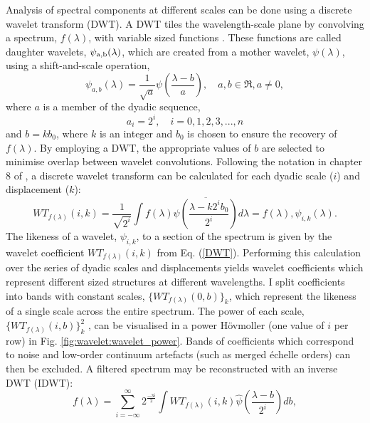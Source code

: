 Analysis of spectral components at different scales can be done using a discrete wavelet transform (DWT). A DWT tiles the wavelength-scale plane by convolving a spectrum, $f( \lambda )$, with variable sized functions \citep{2012AAS...22033004S}. These functions are called daughter wavelets, $\psi_{\rm a,b}(\lambda)$, which are created from a mother wavelet, $\psi(\lambda )$,  using a shift-and-scale operation,
%
\begin{equation}\label{daugthermother}
\psi_{a,b}(\lambda) = \frac{1}{\sqrt{a}}\psi(\frac{\lambda - b}{a}),\quad a,b \in  \Re, a \neq 0 ,
\end{equation}
%
where  $a$ is a member of the dyadic sequence,
%
\begin{equation}\label{dyadic}
a_{i} = 2^{i}, \quad i = 0,1,2,3,...,n
\end{equation}
%
and $b=kb_{0}$, where $k$ is an integer and $b_0$ is chosen to ensure the recovery of $f(\lambda)$. By employing a DWT, the appropriate values of $b$ are selected to minimise overlap between wavelet convolutions. Following the notation in chapter 8 of \citet{Olkkonen2011}, a discrete wavelet transform can be calculated for each dyadic scale ($i$) and displacement ($k$):
%
\begin{equation}\label{DWT}
WT_{f(\lambda)}(i,k) = \frac{1}{\sqrt{2^i}} \int f(\lambda)\overline{\psi \left(\frac{\lambda - k2^ib_0}{2^i} \right)} d\lambda = f(\lambda),\psi_{i,k}(\lambda)
.\end{equation}
%
The likeness of a wavelet, $\psi_{i,k}$, to a section of the spectrum is given by the wavelet coefficient $WT_{f(\lambda)}(i,k)$ from Eq. (\ref{DWT}). Performing this calculation over the series of dyadic scales and displacements yields wavelet coefficients which represent different sized structures at different wavelengths. I split coefficients into bands with constant scales, $\lbrace WT_{f(\lambda)}(0,b)\rbrace_k$, which represent the likeness of a single scale across the entire spectrum. The power of each scale, $\lbrace WT_{f(\lambda)}(i,b)\rbrace_k^2$ , can be visualised in a power H\"{o}vmoller (one value of $i$ per row) in Fig. \ref{fig:wavelet:wavelet_power}. Bands of coefficients which correspond to noise and low-order continuum artefacts (such as merged \'{e}chelle orders) can then be excluded. A filtered spectrum may be reconstructed with an inverse DWT (IDWT):
%
\begin{equation}\label{IDWT}
f(\lambda) = \sum_{i=-\infty }^{\infty} 2^{\frac{-3i}{2}} \int WT_{f(\lambda)}(i,k)\hat{\psi} \left(\frac{\lambda - b}{2^i} \right)db
,\end{equation}
